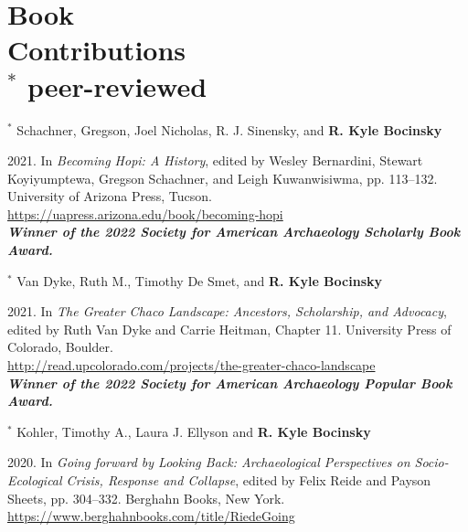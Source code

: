 \section{Book \\ Contributions \\ \normalsize{$^\ast$ peer-reviewed}}

$^\ast$ Schachner, Gregson, Joel Nicholas, R. J. Sinensky, and {\bf R. Kyle Bocinsky}
\begin{list1}
\item[] 2021\hspace{.2cm}{The sustainability of Hopi agriculture}. In \emph{Becoming Hopi: A History}, edited by Wesley Bernardini, Stewart Koyiyumptewa, Gregson Schachner, and Leigh Kuwanwisiwma, pp. 113–132. University of Arizona Press, Tucson.\\\href{https://uapress.arizona.edu/book/becoming-hopi}{https://uapress.arizona.edu/book/becoming-hopi}
	\\\bf\emph{Winner of the 2022 Society for American Archaeology Scholarly Book Award.}
\end{list1}


$^\ast$ Van Dyke, Ruth M., Timothy De Smet, and {\bf R. Kyle Bocinsky}
\begin{list1}
\item[] 2021\hspace{.2cm}{Viewscapes and Soundscapes}. In \emph{The Greater Chaco Landscape: Ancestors, Scholarship, and Advocacy}, edited by Ruth Van Dyke and Carrie Heitman, Chapter 11. University Press of Colorado, Boulder.\\\href{http://read.upcolorado.com/projects/the-greater-chaco-landscape}{http://read.upcolorado.com/projects/the-greater-chaco-landscape}
	\\\bf\emph{Winner of the 2022 Society for American Archaeology Popular Book Award.}

\end{list1}


$^\ast$ Kohler, Timothy A., Laura J. Ellyson and {\bf R. Kyle Bocinsky}
\begin{list1}
\item[] 2020\hspace{.2cm}{Beyond One-Shot Hypotheses: Explaining Three Increasingly Large Collapses in the Northern Pueblo Southwest}. In \emph{Going forward by Looking Back: Archaeological Perspectives on Socio-Ecological Crisis, Response and Collapse}, edited by Felix Reide and Payson Sheets, pp. 304–332. Berghahn Books, New York.\\\href{https://www.berghahnbooks.com/title/RiedeGoing}{https://www.berghahnbooks.com/title/RiedeGoing}
\end{list1}


